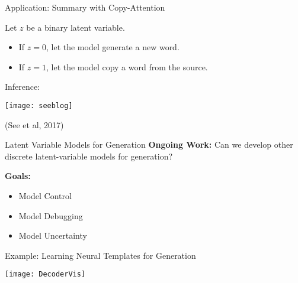\begin{frame}{Application: Summary with Copy-Attention}

Let $z$ be a binary latent variable.
\air
\begin{itemize}
\item If $z = 0$, let the model generate a new word.
\item If $z = 1$, let the model copy a word from the source.
\end{itemize}
\air

Inference:
\begin{center}
\texttt{[image: seeblog]}

\centerline{\small (See et al, 2017)}
\end{center}
\end{frame}


\begin{frame}{ Latent Variable Models for Generation}
  \textbf{Ongoing Work:} Can we develop other discrete latent-variable models for generation?

  \air

  \textbf{Goals:}

    \begin{itemize}
    \item Model Control
    \item Model Debugging
    \item Model Uncertainty
    \end{itemize}
\end{frame}



\begin{frame}{Example: Learning Neural Templates for Generation}

  \begin{center}
    \texttt{[image: DecoderVis]}
  \end{center}
\end{frame}

